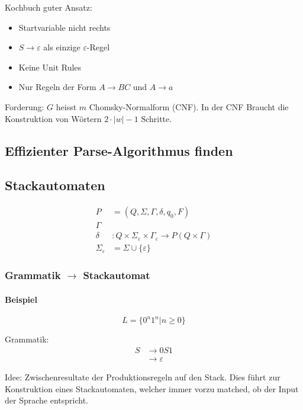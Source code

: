 Kochbuch guter Ansatz:

\begin{itemize}
	\item Startvariable nicht rechts
	\item $S \to \varepsilon$ als einzige $\varepsilon$-Regel
	\item Keine Unit Rules
	\item Nur Regeln der Form $A \to BC$ und $A \to a$
\end{itemize}

Forderung: $G$ heisst $m$ Chomsky-Normalform (CNF). In der CNF Braucht die Konstruktion von Wörtern $2 \cdot |w| -1$ Schritte.

 \subsection{Effizienter Parse-Algorithmus finden}
 

\subsection{Stackautomaten}

\begin{align*}
P &= (Q, \Sigma, \Gamma, \delta, q_0, F) \\
\Gamma & \\
\delta&: Q \times \Sigma_\varepsilon \times \Gamma_\varepsilon \to P(Q \times \Gamma) \\
\Sigma_\varepsilon &= \Sigma \cup \{ \varepsilon \}
\end{align*}

\subsubsection{Grammatik $\rightarrow$ Stackautomat}

\paragraph{Beispiel}

\[
L = \{ 0^n 1^n | n \geq 0 \}
\]

Grammatik:
\begin{align*}
S &\rightarrow 0S1 \\
  &\rightarrow \varepsilon
\end{align*}

Idee: Zwischenresultate der Produktionsregeln auf den Stack. Dies führt zur Konstruktion eines Stackautomaten, welcher immer vorzu matched, ob der Input der Sprache entspricht.



